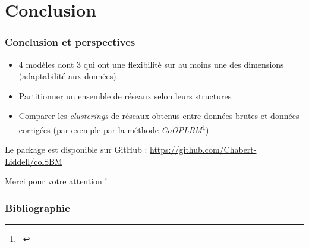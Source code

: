 \documentclass{beamer}
\begin{document}
\section{Conclusion}
\label{sec:conclusion}
\begin{frame}
    \frametitle{Conclusion et perspectives}

    \begin{itemize}
        \item 4 modèles dont 3 qui ont une flexibilité sur au moins une des dimensions (adaptabilité aux données)
        \item Partitionner un ensemble de réseaux selon leurs structures
        \item Comparer les \emph{clusterings} de réseaux obtenus entre données brutes et données corrigées (par exemple par la méthode \emph{CoOPLBM}\footnote{~\cite{anakokDisentanglingStructureEcological2022}})
    \end{itemize}

    \bigskip
    \centering
    Le package est disponible sur GitHub : \faGithub  \url{https://github.com/Chabert-Liddell/colSBM}

    \bigskip
    \huge
    Merci pour votre attention !

\end{frame}
\renewcommand{\pgfuseimage}[1]{\scalebox{.75}{\texttt{[image: \#1]}}}
\begin{frame}
    \frametitle{Bibliographie}
    \printbibliography
\end{frame}
\end{document}
